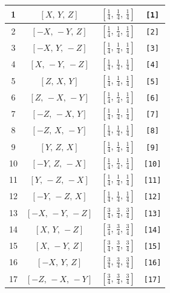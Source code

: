 \documentclass[fleqn,8pt]{jsarticle}
\begin{document}
\begin{longtable}{cccc}
1 & $\left[ X,\, Y,\, Z \right]$ & $\left[ \frac{1}{4},\, \frac{1}{4},\, \frac{1}{4} \right]$ & {\tt [1]} \\ \hline
2 & $\left[ - X,\, - Y,\, Z \right]$ & $\left[ \frac{1}{4},\, \frac{1}{4},\, \frac{1}{4} \right]$ & {\tt [2]} \\ \hline
3 & $\left[ - X,\, Y,\, - Z \right]$ & $\left[ \frac{1}{4},\, \frac{1}{4},\, \frac{1}{4} \right]$ & {\tt [3]} \\ \hline
4 & $\left[ X,\, - Y,\, - Z \right]$ & $\left[ \frac{1}{4},\, \frac{1}{4},\, \frac{1}{4} \right]$ & {\tt [4]} \\ \hline
5 & $\left[ Z,\, X,\, Y \right]$ & $\left[ \frac{1}{4},\, \frac{1}{4},\, \frac{1}{4} \right]$ & {\tt [5]} \\ \hline
6 & $\left[ Z,\, - X,\, - Y \right]$ & $\left[ \frac{1}{4},\, \frac{1}{4},\, \frac{1}{4} \right]$ & {\tt [6]} \\ \hline
7 & $\left[ - Z,\, - X,\, Y \right]$ & $\left[ \frac{1}{4},\, \frac{1}{4},\, \frac{1}{4} \right]$ & {\tt [7]} \\ \hline
8 & $\left[ - Z,\, X,\, - Y \right]$ & $\left[ \frac{1}{4},\, \frac{1}{4},\, \frac{1}{4} \right]$ & {\tt [8]} \\ \hline
9 & $\left[ Y,\, Z,\, X \right]$ & $\left[ \frac{1}{4},\, \frac{1}{4},\, \frac{1}{4} \right]$ & {\tt [9]} \\ \hline
10 & $\left[ - Y,\, Z,\, - X \right]$ & $\left[ \frac{1}{4},\, \frac{1}{4},\, \frac{1}{4} \right]$ & {\tt [10]} \\ \hline
11 & $\left[ Y,\, - Z,\, - X \right]$ & $\left[ \frac{1}{4},\, \frac{1}{4},\, \frac{1}{4} \right]$ & {\tt [11]} \\ \hline
12 & $\left[ - Y,\, - Z,\, X \right]$ & $\left[ \frac{1}{4},\, \frac{1}{4},\, \frac{1}{4} \right]$ & {\tt [12]} \\ \hline
13 & $\left[ - X,\, - Y,\, - Z \right]$ & $\left[ \frac{3}{4},\, \frac{3}{4},\, \frac{3}{4} \right]$ & {\tt [13]} \\ \hline
14 & $\left[ X,\, Y,\, - Z \right]$ & $\left[ \frac{3}{4},\, \frac{3}{4},\, \frac{3}{4} \right]$ & {\tt [14]} \\ \hline
15 & $\left[ X,\, - Y,\, Z \right]$ & $\left[ \frac{3}{4},\, \frac{3}{4},\, \frac{3}{4} \right]$ & {\tt [15]} \\ \hline
16 & $\left[ - X,\, Y,\, Z \right]$ & $\left[ \frac{3}{4},\, \frac{3}{4},\, \frac{3}{4} \right]$ & {\tt [16]} \\ \hline
17 & $\left[ - Z,\, - X,\, - Y \right]$ & $\left[ \frac{3}{4},\, \frac{3}{4},\, \frac{3}{4} \right]$ & {\tt [17]} \\ \hline

\end{longtable}
\end{document}

